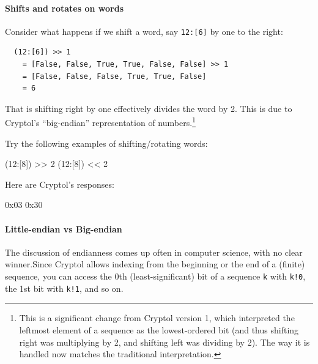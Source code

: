 \paragraph*{Shifts and rotates on words} Consider what happens if we
shift a word, say {\tt 12:[6]} by one to the right:
\indShiftLeft\indShiftRight\indRotLeft\indRotRight
\begin{Verbatim}
  (12:[6]) >> 1
    = [False, False, True, True, False, False] >> 1
    = [False, False, False, True, True, False]
    = 6
\end{Verbatim}
That is shifting right by one effectively divides the word by 2. This
is due to Cryptol's ``big-endian'' representation of
numbers.\footnote{This is a significant change from Cryptol version 1,
  which interpreted the leftmost element of a sequence as the
  lowest-ordered bit (and thus shifting right was multiplying by 2,
  and shifting left was dividing by 2). The way it is handled now
  matches the traditional
  interpretation.}\indRotLeft\indRotRight\indShiftLeft\indShiftRight

\restartrepl
\begin{Exercise}\label{ex:words:6}
Try the following examples of shifting/rotating words:
\begin{replinVerb}
  (12:[8]) >> 2
  (12:[8]) << 2
\end{replinVerb}
\end{Exercise}
\begin{Answer}
Here are Cryptol's responses:
\begin{reploutVerb}
  0x03
  0x30
\end{reploutVerb}
\end{Answer}


\paragraph*{Little-endian vs Big-endian} The discussion of endianness
comes up often in computer science, with no clear
winner.\indEndianness Since Cryptol allows indexing from the beginning
or the end of a (finite) sequence, you can access the 0th
(least-significant) bit of a sequence \texttt{k} with \texttt{k!0}, the 1st bit with
\texttt{k!1}, and so on.\indIndex

